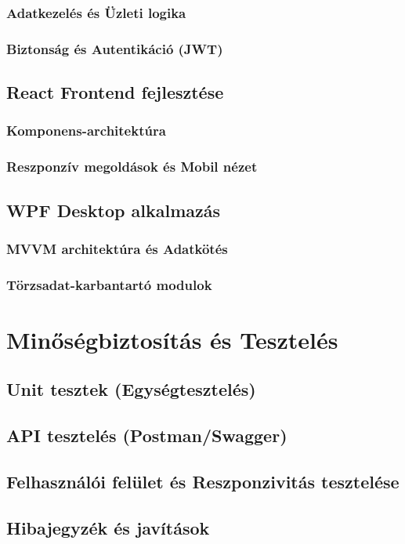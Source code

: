 \documentclass[colorlinks]{thesis-kando}
\theoremstyle{definition}
\theoremstyle{remark}
\begin{document}
\subsection{Adatkezelés és Üzleti logika}
\subsection{Biztonság és Autentikáció (JWT)}
\section{React Frontend fejlesztése}
\subsection{Komponens-architektúra}
\subsection{Reszponzív megoldások és Mobil nézet}
\section{WPF Desktop alkalmazás}
\subsection{MVVM architektúra és Adatkötés}
\subsection{Törzsadat-karbantartó modulok}

\chapter{Minőségbiztosítás és Tesztelés}
\section{Unit tesztek (Egységtesztelés)}
\section{API tesztelés (Postman/Swagger)}
\section{Felhasználói felület és Reszponzivitás tesztelése}
\section{Hibajegyzék és javítások}
\end{document}

